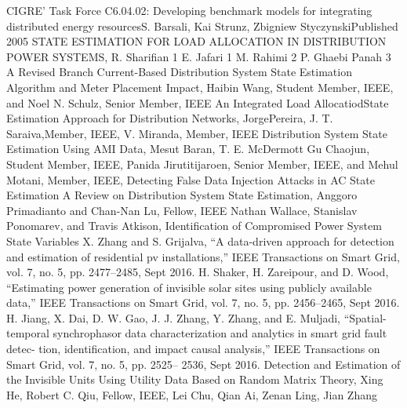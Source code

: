 \begin{thebibliography}{00}
   CIGRE' Task Force C6.04.02: Developing benchmark models for integrating distributed energy resourcesS. Barsali, Kai Strunz, Zbigniew StyczynskiPublished 2005
   STATE ESTIMATION FOR LOAD ALLOCATION IN DISTRIBUTION POWER SYSTEMS, R. Sharifian 1 E. Jafari 1 M. Rahimi 2 P. Ghaebi Panah 3
   A Revised Branch Current-Based Distribution System State Estimation Algorithm and Meter Placement Impact, Haibin Wang, Student Member, IEEE, and Noel N. Schulz, Senior Member, IEEE
   An Integrated Load AllocatiodState Estimation Approach for Distribution Networks, JorgePereira, J. T. Saraiva,Member, IEEE, V. Miranda, Member, IEEE
   Distribution System State Estimation Using AMI Data, Mesut Baran, T. E. McDermott
   Gu Chaojun, Student Member, IEEE, Panida Jirutitijaroen, Senior Member, IEEE, and Mehul Motani, Member, IEEE, Detecting False Data Injection Attacks in AC State Estimation
   A Review on Distribution System State Estimation, Anggoro Primadianto and Chan-Nan Lu, Fellow, IEEE
   Nathan Wallace, Stanislav Ponomarev, and Travis Atkison, Identification of Compromised Power System State Variables
   X. Zhang and S. Grijalva, “A data-driven approach for detection and estimation of residential pv installations,” IEEE Transactions on Smart Grid, vol. 7, no. 5, pp. 2477–2485, Sept 2016.
   H. Shaker, H. Zareipour, and D. Wood, “Estimating power generation of invisible solar sites using publicly available data,” IEEE Transactions on Smart Grid, vol. 7, no. 5, pp. 2456–2465, Sept 2016.
   H. Jiang, X. Dai, D. W. Gao, J. J. Zhang, Y. Zhang, and E. Muljadi, “Spatial-temporal synchrophasor data characterization and analytics in smart grid fault detec- tion, identification, and impact causal analysis,” IEEE Transactions on Smart Grid, vol. 7, no. 5, pp. 2525– 2536, Sept 2016.
   Detection and Estimation of the Invisible Units Using Utility Data Based on Random Matrix Theory, Xing He, Robert C. Qiu, Fellow, IEEE, Lei Chu, Qian Ai, Zenan Ling, Jian Zhang
\end{thebibliography}
